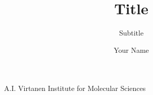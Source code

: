 %
%
%
\title{{Title}}
\subtitle{Subtitle} %
\author{Your Name}
%
%

{A.I. Virtanen Institute for Molecular Sciences}
{}
 {}{} %
%
\clearpage

%
%
